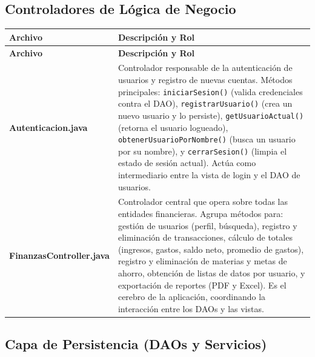 \documentclass[utf8]{article}
\begin{document}
\subsection*{Controladores de Lógica de Negocio}

\begin{longtable}{p{0.15\linewidth}p{0.85\linewidth}}
\hline
\textbf{Archivo} & \textbf{Descripción y Rol} \\ \hline
\endfirsthead
\hline
\textbf{Archivo} & \textbf{Descripción y Rol} \\ \hline
\endhead
\hline
\endfoot
\hline
\endlastfoot
\textbf{Autenticacion.java} & Controlador responsable de la autenticación de usuarios y registro de nuevas cuentas. Métodos principales: \texttt{iniciarSesion()} (valida credenciales contra el DAO), \texttt{registrarUsuario()} (crea un nuevo usuario y lo persiste), \texttt{getUsuarioActual()} (retorna el usuario logueado), \texttt{obtenerUsuarioPorNombre()} (busca un usuario por su nombre), y \texttt{cerrarSesion()} (limpia el estado de sesión actual). Actúa como intermediario entre la vista de login y el DAO de usuarios. \\ \hline
\textbf{FinanzasController.java} & Controlador central que opera sobre todas las entidades financieras. Agrupa métodos para: gestión de usuarios (perfil, búsqueda), registro y eliminación de transacciones, cálculo de totales (ingresos, gastos, saldo neto, promedio de gastos), registro y eliminación de materias y metas de ahorro, obtención de listas de datos por usuario, y exportación de reportes (PDF y Excel). Es el cerebro de la aplicación, coordinando la interacción entre los DAOs y las vistas. \\ \hline
\end{longtable}

\subsection*{Capa de Persistencia (DAOs y Servicios)}
\end{document}
